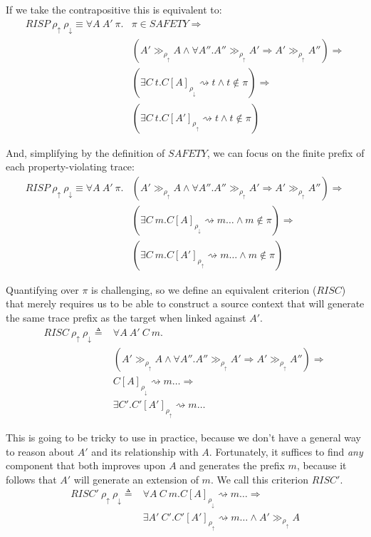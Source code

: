 \documentclass{article}
\begin{document}
If we take the contrapositive this is equivalent to:
\[\begin{split}
RISP ~ \rho_\uparrow ~ \rho_\downarrow \equiv \forall A ~ A' ~ \pi . & \pi \in \mathit{SAFETY} \Rightarrow \\
& (A' \gg_{\rho_\uparrow} A \land
\forall A'' . A'' \gg_{\rho_\uparrow} A' \Rightarrow A' \gg_{\rho_\uparrow} A'') \Rightarrow \\
& (\exists C ~ t . C[A]_{\rho_\downarrow} \rightsquigarrow t \land t \not \in \pi) \Rightarrow \\
& (\exists C ~ t . C[A']_{\rho_\uparrow} \rightsquigarrow t \land t \not \in \pi)
\end{split}\]

And, simplifying by the definition of \(\mathit{SAFETY}\), we can focus on the finite prefix
of each property-violating trace:
%
\[\begin{split}
RISP ~ \rho_\uparrow ~ \rho_\downarrow \equiv \forall A ~ A' ~ \pi .
& (A' \gg_{\rho_\uparrow} A \land
\forall A'' . A'' \gg_{\rho_\uparrow} A' \Rightarrow A' \gg_{\rho_\uparrow} A'') \Rightarrow \\
& (\exists C ~ m . C[A]_{\rho_\downarrow} \rightsquigarrow m\ldots \land m \not \in \pi) \Rightarrow \\
& (\exists C ~ m . C[A']_{\rho_\uparrow} \rightsquigarrow m\ldots \land m \not \in \pi)
\end{split}\]

Quantifying over \(\pi\) is challenging, so we define an equivalent criterion (\(RISC\)) that
merely requires us to be able to construct a source context that will generate the same trace
prefix as the target when linked against \(A'\).
%
\[\begin{split}
RISC ~ \rho_\uparrow ~ \rho_\downarrow \triangleq & \forall A ~ A' ~ C ~ m . \\
& (A' \gg_{\rho_\uparrow} A \land
\forall A'' . A'' \gg_{\rho_\uparrow} A' \Rightarrow A' \gg_{\rho_\uparrow} A'') \Rightarrow \\
& C[A]_{\rho_\downarrow} \rightsquigarrow m\ldots \Rightarrow \\
& \exists C' . C'[A']_{\rho_\uparrow} \rightsquigarrow m\ldots
\end{split}\]

This is going to be tricky to use in practice, because we don't have a general way
to reason about \(A'\) and its relationship with \(A\). Fortunately, it suffices to
find {\em any} component that both improves upon \(A\) and generates the prefix \(m\),
because it follows that \(A'\) will generate an extension of \(m\). We call this criterion
\(RISC'\).
%
\[\begin{split}
RISC' ~ \rho_\uparrow ~ \rho_\downarrow \triangleq & \forall A ~ C ~ m .
C[A]_{\rho_\downarrow} \rightsquigarrow m\ldots \Rightarrow \\
& \exists A' ~ C' . C'[A']_{\rho_\uparrow} \rightsquigarrow m\ldots \land A' \gg_{\rho_\uparrow} A \\
\end{split}\]
\end{document}
